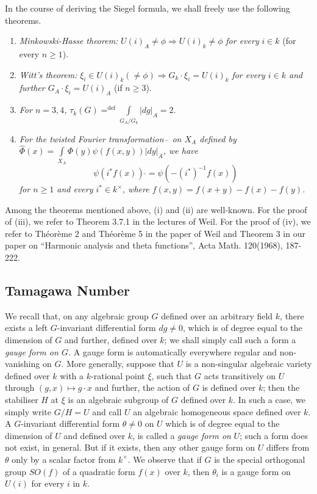 In the course of deriving the Siegel formula, we shall freely use the
following theorems.
\begin{enumerate}
\renewcommand{\theenumi}{\roman{enumi}}
\renewcommand{\labelenumi}{(\theenumi)}
\item {\em Minkowski-Hasse theorem:} $U(i)_{A}\neq \phi
  \Rightarrow U(i)_{k}\neq \phi$ {\em for every} $i\in k$ (for every
  $n\geq 1$).
\item {\em Witt's theorem:} $\xi_{i}\in U(i)_{k}(\neq \phi)\Rightarrow
  G_{k}\cdot \xi_{i}=U(i)_{k}$ {\em for every $i\in k$ and further
    $G_{A}\cdot\xi_{i}=U(i)_{A}$} (if $n\geq 3$).
\item {\em For $n=3,4$,}
  $\tau_{k}(G){\displaystyle{\mathop{=}^{\text{def}}}} 
  \int\limits_{G_{A}/G_{k}}|dg|_{A}=2$. 
\item {\em For the twisted Fourier transformation $\hat{\;}$ on
  $X_{A}$ defined by
  $\hat{\Phi}(x)=\int\limits_{X_{A}}\Phi(y)\psi(f(x,y))|dy|_{A}$,
  we have}
$$
\psi(i^{\ast}f(x))~\hat{}=\psi(-(i^{\ast})^{-1}f(x))
$$
{\em for $n\geq 1$ and every $i^{\ast}\in k^{\times}$, where
  $f(x,y)=f(x+y)-f(x)-f(y)$.} 
\end{enumerate}

Among the theorems mentioned above, (i) and (ii) are well-known. For
the proof of (iii), we refer to Theorem 3.7.1 in the lectures
\cite{Wei 3} of Weil. For the proof of (iv), we refer to Th\'eor\`eme
2 and Th\'eor\`eme 5 in the paper \cite{Wei 4}\pageoriginale of Weil and
Theorem 3 in our paper on ``Harmonic analysis and theta functions'',
Acta Math. 120(1968), 187-222.

\subsection{Tamagawa Number}\label{chap4:sec3:subsec3} %

We recall that, on any algebraic group $G$ defined over an arbitrary
field $k$, there exists a left $G$-invariant differential form $dg\neq
0$, which is of degree equal to the dimension of $G$ and further,
defined over $k$; we shall simply call such a form a {\em gauge form
  on $G$.} A gauge form is automatically everywhere regular and
non-vanishing on $G$. More generally, suppose that $U$ is a
non-singular algebraic variety defined over $k$ with a $k$-rational
point $\xi$, such that $G$ acts transitively on $U$ through
$(g,x)\mapsto g\cdot x$ and further, the action of $G$ is defined over
$k$; then the stabiliser $H$ at $\xi$ is an algebraic subgroup of $G$
defined over $k$. In such a case, we simply write $G/H=U$ and call $U$
an algebraic homogeneous space defined over $k$. A $G$-invariant
differential form $\theta\neq 0$ on $U$ which is of degree equal to
the dimension of $U$ and defined over $k$, is called a {\em gauge form
  on} $U$; such a form does not exist, in general. But if it exists,
then any other gauge form on $U$ differs from $\theta$ only by a
scalar factor from $k^{\times}$. We observe that if $G$ is the special
orthogonal group $SO(f)$ of a quadratic form $f(x)$ over $k$, then
$\theta_{i}$ is a gauge form on $U(i)$ for every $i$ in $k$.

